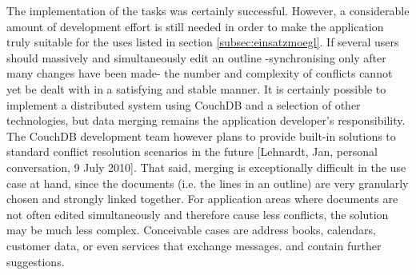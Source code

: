 The implementation of the tasks was certainly successful. However, a considerable amount of development effort is still needed in order to make the application truly suitable for the uses listed in section \ref{subsec:einsatzmoegl}. If several users should massively and simultaneously edit an outline -synchronising only after many changes have been made- the number and complexity of conflicts cannot yet be dealt with in a satisfying and stable manner. It is certainly possible to implement a distributed system using CouchDB and a selection of other technologies, but data merging remains the application developer's responsibility. The CouchDB development team however plans to provide built-in solutions to standard conflict resolution scenarios in the future [Lehnardt, Jan, personal conversation, 9 July 2010]. That said, merging is exceptionally difficult in the use case at hand, since the documents (i.e. the lines in an outline) are very granularly chosen and strongly linked together. For application areas where documents are not often edited simultaneously and therefore cause less conflicts, the solution may be much less complex. Conceivable cases are address books, calendars, customer data, or even services that exchange messages.  and \cite{couch:whatsnew} contain further suggestions.


